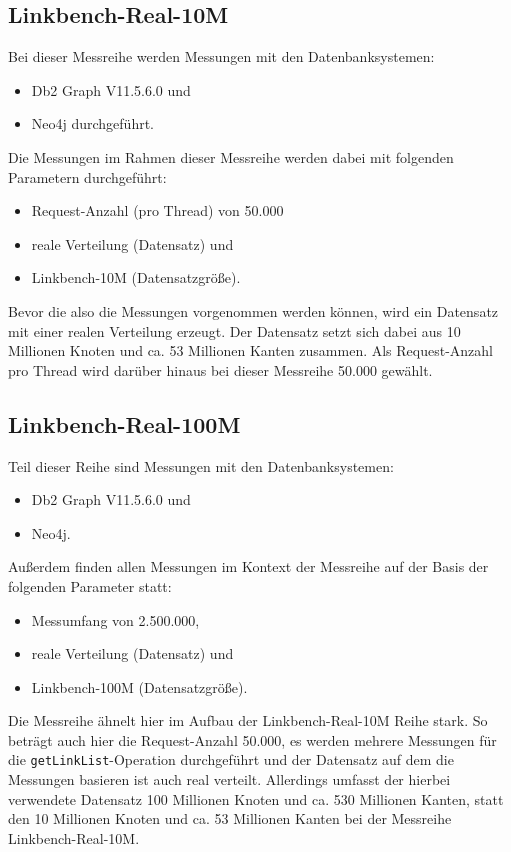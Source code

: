\subsection{Linkbench-Real-10M}
Bei dieser Messreihe werden Messungen mit den Datenbanksystemen:
\begin{itemize}
    \item Db2 Graph V11.5.6.0 und 
    \item Neo4j durchgeführt. 
\end{itemize}

Die Messungen im Rahmen dieser Messreihe werden dabei mit folgenden Parametern durchgeführt:
\begin{itemize}
    \item Request-Anzahl (pro Thread) von 50.000
    \item reale Verteilung (Datensatz) und 
    \item Linkbench-10M (Datensatzgröße).
\end{itemize}
Bevor die also die Messungen vorgenommen werden können, wird ein Datensatz mit einer realen Verteilung erzeugt. Der Datensatz setzt sich dabei aus 10 Millionen Knoten und ca. 53 Millionen Kanten zusammen. Als Request-Anzahl pro Thread wird darüber hinaus bei dieser Messreihe 50.000 gewählt. 

\subsection{Linkbench-Real-100M}
Teil dieser Reihe sind Messungen mit den Datenbanksystemen:
\begin{itemize}
    \item Db2 Graph V11.5.6.0 und 
    \item Neo4j. 
\end{itemize}

Außerdem finden allen Messungen im Kontext der Messreihe auf der Basis der folgenden Parameter statt:
\begin{itemize}
    \item Messumfang von 2.500.000,
    \item reale Verteilung (Datensatz) und
    \item Linkbench-100M (Datensatzgröße).
\end{itemize}
Die Messreihe ähnelt hier im Aufbau der Linkbench-Real-10M Reihe stark. So beträgt auch hier die Request-Anzahl 50.000, es werden mehrere Messungen für die \texttt{getLinkList}-Operation durchgeführt und der Datensatz auf dem die Messungen basieren ist auch real verteilt. Allerdings umfasst der hierbei verwendete Datensatz 100 Millionen Knoten und ca. 530 Millionen Kanten, statt den 10 Millionen Knoten und ca. 53 Millionen Kanten bei der Messreihe Linkbench-Real-10M.

